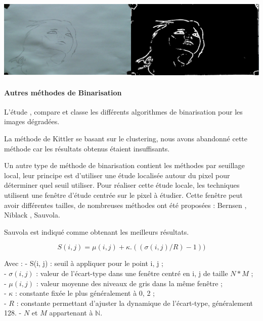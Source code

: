 \begin{center}
\includegraphics[width=\textwidth]{images/sobelComp.png}
\end{center}


\paragraph{Autres méthodes de Binarisation\vspace{0.5cm}\\}


L'étude \cite{Mehmet04}, compare et classe les différents algorithmes de binarisation pour les images dégradées.

La méthode de Kittler \cite{Kittler86} se basant sur le clustering, nous avons abandonné cette méthode car les résultats obtenus étaient insuffisants.

Un autre type de méthode de binarisation contient les méthodes par seuillage local, leur principe est d’utiliser une étude localisée autour du pixel pour déterminer quel seuil utiliser. Pour réaliser cette étude locale, les techniques utilisent une fenêtre d’étude centrée sur le pixel à étudier. Cette fenêtre peut avoir différentes tailles, de nombreuses méthodes ont été proposées : Bernsen \cite{JB86}, Niblack \cite{Nib86}, Sauvola\cite{Sauvola00}.

Sauvola est indiqué comme obtenant les meilleurs résultats.

\begin{equation}
	S(i,j) = \mu(i,j) + \kappa.((\sigma(i,j)/R)-1))
\end{equation}

Avec :
- S(i, j) : seuil à appliquer pour le point i, j ;\\
- $\sigma(i, j)$ : valeur de l’écart-type dans une fenêtre centré en i, j de taille $N * M$ ;\\
- $\mu(i, j)$ : valeur moyenne des niveaux de gris dans la même fenêtre ;\\
- $\kappa$ : constante fixée le plus généralement à 0, 2 ;\\
- $R$ : constante permettant d'ajuster la dynamique de l’écart-type, généralement 128.
- $N$ et $M$ appartenant à $\mathbb{N}$.\\

